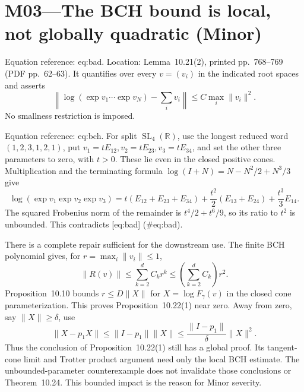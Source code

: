 \documentclass[10pt]{article}
\begin{document}
\section*{M03—The BCH bound is local, not globally quadratic (Minor)}
Equation reference: eq:bad. Location: Lemma 10.21(2), printed pp. 768–769 (PDF pp. 62–63). It quantifies over every \(v=(v_i)\) in the indicated root spaces and asserts \[
 \left\|\log(\exp v_1\cdots\exp v_N)-\sum_i v_i\right\|
 \leq C\max_i\|v_i\|^2 .\] No smallness restriction is imposed.\par
Equation reference: eq:bch. For split \(\operatorname{SL}_4(\mathbb R)\), use the longest reduced word \((1,2,3,1,2,1)\), put \(v_1=tE_{12},v_2=tE_{23},v_3=tE_{34}\), and set the other three parameters to zero, with \(t>0\). These lie even in the closed positive cones. Multiplication and the terminating formula \(\log(I+N)=N-N^2/2+N^3/3\) give \[
 \log(\exp v_1\exp v_2\exp v_3)
 =t(E_{12}+E_{23}+E_{34})
  +\frac{t^2}{2}(E_{13}+E_{24})+\frac{t^3}{3}E_{14}.\] The squared Frobenius norm of the remainder is \(t^4/2+t^6/9\), so its ratio to \(t^2\) is unbounded. This contradicts [eq:bad] (\#eq:bad).\par
There is a complete repair sufficient for the downstream use. The finite BCH polynomial gives, for \(r=\max_i\|v_i\|\leq1\), \[\|R(v)\|\leq\sum_{k=2}^{d}C_kr^k\leq
 \left(\sum_{k=2}^{d}C_k\right)r^2 .\] Proposition 10.10 bounds \(r\leq D\|X\|\) for \(X=\log F_\gamma(v)\) in the closed cone parameterization. This proves Proposition 10.22(1) near zero. Away from zero, say \(\|X\|\geq\delta\), use \[\|X-p_1X\|\leq\|I-p_1\|\|X\|
 \leq\frac{\|I-p_1\|}{\delta}\|X\|^2.\] Thus the conclusion of Proposition 10.22(1) still has a global proof. Its tangent-cone limit and Trotter product argument need only the local BCH estimate. The unbounded-parameter counterexample does not invalidate those conclusions or Theorem 10.24. This bounded impact is the reason for Minor severity.\par
\end{document}
